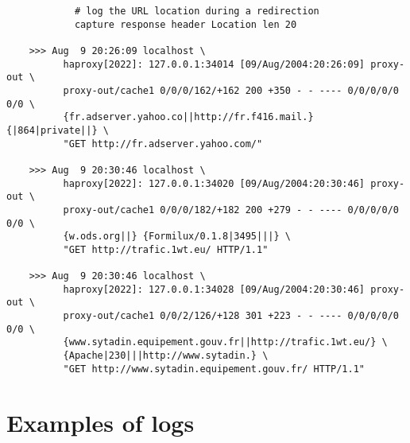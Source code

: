 \begin{verbatim}
            # log the URL location during a redirection
            capture response header Location len 20

    >>> Aug  9 20:26:09 localhost \
          haproxy[2022]: 127.0.0.1:34014 [09/Aug/2004:20:26:09] proxy-out \
          proxy-out/cache1 0/0/0/162/+162 200 +350 - - ---- 0/0/0/0/0 0/0 \
          {fr.adserver.yahoo.co||http://fr.f416.mail.} {|864|private||} \
          "GET http://fr.adserver.yahoo.com/"

    >>> Aug  9 20:30:46 localhost \
          haproxy[2022]: 127.0.0.1:34020 [09/Aug/2004:20:30:46] proxy-out \
          proxy-out/cache1 0/0/0/182/+182 200 +279 - - ---- 0/0/0/0/0 0/0 \
          {w.ods.org||} {Formilux/0.1.8|3495|||} \
          "GET http://trafic.1wt.eu/ HTTP/1.1"

    >>> Aug  9 20:30:46 localhost \
          haproxy[2022]: 127.0.0.1:34028 [09/Aug/2004:20:30:46] proxy-out \
          proxy-out/cache1 0/0/2/126/+128 301 +223 - - ---- 0/0/0/0/0 0/0 \
          {www.sytadin.equipement.gouv.fr||http://trafic.1wt.eu/} \
          {Apache|230|||http://www.sytadin.} \
          "GET http://www.sytadin.equipement.gouv.fr/ HTTP/1.1"
\end{verbatim}

\section{Examples of logs}

